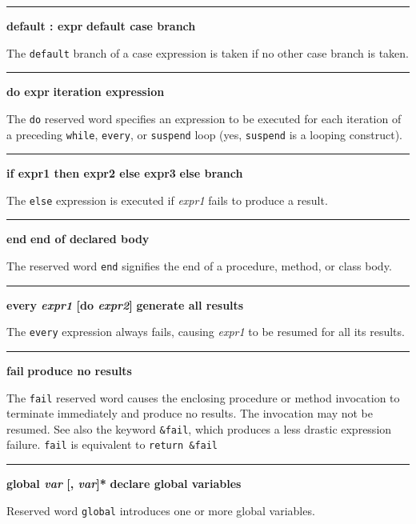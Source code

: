 \bigskip\hrule\vspace{0.1cm}
\noindent
{\bf default : expr } \hfill {\bf default case branch}

\noindent
{}The \texttt{default} branch of a case
expression is taken if no other case branch is taken.

\bigskip\hrule\vspace{0.1cm}
\noindent
{\bf do expr } \hfill {\bf iteration expression}

\noindent
{}The \texttt{do} reserved word specifies an
expression to be executed for each iteration of a preceding
\texttt{while}, \texttt{every}, or \texttt{suspend} loop (yes,
\texttt{suspend} is a looping construct).

\bigskip\hrule\vspace{0.1cm}
\noindent
{\bf if expr1 then expr2 else expr3 } \hfill {\bf else branch}

\noindent
{}The \texttt{else} expression is executed if \textit{expr1}
fails to produce a result.

\bigskip\hrule\vspace{0.1cm}
\noindent
{\bf end } \hfill {\bf end of declared body}

\noindent
{}The reserved word \texttt{end} signifies the end of a
procedure, method, or class body.

\bigskip\hrule\vspace{0.1cm}
\noindent
{\bf \textbf{every} \textit{expr1} [do \textit{expr2}] } \hfill {\bf generate all results}

\noindent
{}The \texttt{every} expression always fails, causing
\textit{expr1} to be resumed for all its results.

\bigskip\hrule\vspace{0.1cm}
\noindent
{\bf fail } \hfill {\bf produce no results}

\noindent
{}The \texttt{fail} reserved word causes the enclosing
procedure or method invocation to terminate immediately and produce no
results. The invocation may not be resumed. See also the keyword
\texttt{\&fail}, which produces a less drastic expression failure.
\texttt{fail} is equivalent to \texttt{return \&fail}

\bigskip\hrule\vspace{0.1cm}
\noindent
{\bf \textbf{global} \textit{var} [, \textit{var}]* } \hfill {\bf declare global variables}

\noindent
{}Reserved word \texttt{global} introduces one or more
global variables.

